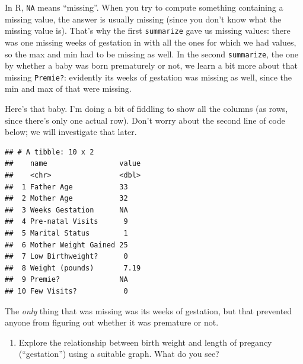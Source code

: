 \documentclass[]{tufte-book}
\newenvironment{Shaded}{}{}
\newcommand{\DataTypeTok}[1]{\textcolor[rgb]{0.56,0.13,0.00}{#1}}
\newcommand{\KeywordTok}[1]{\textcolor[rgb]{0.00,0.44,0.13}{\textbf{#1}}}
\newcommand{\NormalTok}[1]{#1}
\newcommand{\OperatorTok}[1]{\textcolor[rgb]{0.40,0.40,0.40}{#1}}
\newcommand{\StringTok}[1]{\textcolor[rgb]{0.25,0.44,0.63}{#1}}
\providecommand{\tightlist}{%
  \setlength{\itemsep}{0pt}\setlength{\parskip}{0pt}}
\theoremstyle{definition}
\theoremstyle{definition}
\theoremstyle{definition}
\theoremstyle{remark}
\begin{document}
In R, \texttt{NA} means ``missing''. When you try to compute something
containing a missing value, the answer is usually missing (since you
don't know what the missing value is). That's why the first
\texttt{summarize} gave us missing values: there was one missing weeks
of gestation in with all the ones for which we had values, so the max
and min had to be missing as well. In the second \texttt{summarize}, the
one by whether a baby was born prematurely or not, we learn a bit more
about that missing \texttt{Premie?}: evidently its weeks of gestation
was missing as well, since the min and max of that were missing.

Here's that baby. I'm doing a bit of fiddling to show all the columns
(as rows, since there's only one actual row). Don't worry about the
second line of code below; we will investigate that later.

\begin{Shaded}
\end{Shaded}

\begin{verbatim}
## # A tibble: 10 x 2
##    name                 value
##    <chr>                <dbl>
##  1 Father Age           33   
##  2 Mother Age           32   
##  3 Weeks Gestation      NA   
##  4 Pre-natal Visits      9   
##  5 Marital Status        1   
##  6 Mother Weight Gained 25   
##  7 Low Birthweight?      0   
##  8 Weight (pounds)       7.19
##  9 Premie?              NA   
## 10 Few Visits?           0
\end{verbatim}

The \emph{only} thing that was missing was its weeks of gestation, but
that prevented anyone from figuring out whether it was premature or not.

\begin{enumerate}
\def\labelenumi{(\alph{enumi})}
\setcounter{enumi}{1}
\tightlist
\item
  Explore the relationship between birth weight and length of pregancy
  (``gestation'') using a suitable graph. What do you see?
\end{enumerate}
\end{document}
